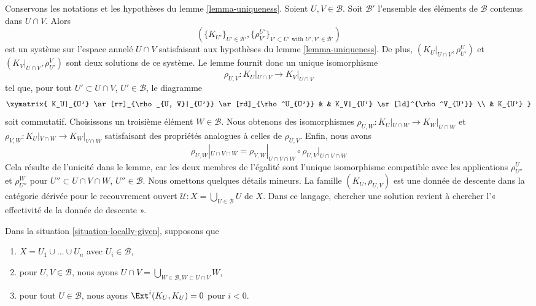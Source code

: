 {\begin{remark}
Conservons les notations et les hypothèses du lemme \ref{lemma-uniqueness}. Soient $U, V \in \mathcal{B}$. Soit $\mathcal{B}'$ l'ensemble des éléments de $\mathcal{B}$ contenus dans $U \cap V$. Alors
$$
(\{K_{U'}\}_{U' \in \mathcal{B}'},
\{\rho_{V'}^{U'}\}_{V' \subset U'\text{ with }U', V' \in \mathcal{B}'})
$$
est un système sur l'espace annelé $U \cap V$
satisfaisant aux hypothèses du lemme \ref{lemma-uniqueness}. De plus, $(K_U|_{U \cap V}, \rho^U_{U'})$ et
$(K_V|_{U \cap V}, \rho^V_{U'})$ sont deux solutions de ce système. Le lemme fournit donc un unique isomorphisme
$$
\rho_{U, V} : K_U|_{U \cap V} \longrightarrow K_V|_{U \cap V}
$$
tel que, pour tout $U' \subset U \cap V$, $U' \in \mathcal{B}$, le diagramme
$$
\xymatrix{
K_U|_{U'} \ar[rr]_{\rho_{U, V}|_{U'}} \ar[rd]_{\rho^U_{U'}} & &
K_V|_{U'} \ar[ld]^{\rho^V_{U'}} \\
& K_{U'}
}
$$
soit commutatif. Choisissons un troisième élément $W \in \mathcal{B}$. Nous obtenons des isomorphismes
$\rho_{U, W} : K_U|_{U \cap W} \to K_W|_{U \cap W}$ et
$\rho_{V, W} : K_U|_{V \cap W} \to K_W|_{V \cap W}$ satisfaisant des propriétés analogues à celles de $\rho_{U, V}$. Enfin, nous avons
$$
\rho_{U, W}|_{U \cap V \cap W} =
\rho_{V, W}|_{U \cap V \cap W} \circ \rho_{U, V}|_{U \cap V \cap W}
$$
Cela résulte de l'unicité dans le lemme, car les deux membres de l'égalité sont l'unique isomorphisme compatible avec les applications $\rho^U_{U''}$ et $\rho^W_{U''}$
pour $U'' \subset U \cap V \cap W$, $U'' \in \mathcal{B}$. Nous omettons quelques détails mineurs. La famille $(K_U, \rho_{U, V})$ est une donnée de descente dans la catégorie dérivée pour le recouvrement ouvert
$\mathcal{U} : X = \bigcup_{U \in \mathcal{B}} U$ de $X$. Dans ce langage, chercher une solution revient à chercher l'« effectivité de la donnée de descente ».

\end{remark}

\begin{lemma}

\label{lemma-solution-in-finite-case}

Dans la situation \ref{situation-locally-given}, supposons que

\begin{enumerate}

\item  $X = U_1 \cup \ldots \cup U_n$ avec $U_i \in \mathcal{B}$,
\item pour $U, V \in \mathcal{B}$, nous ayons
$U \cap V = \bigcup_{W \in \mathcal{B}, W \subset U \cap V} W$,
\item pour tout $U \in \mathcal{B}$, nous ayons $\Ext^i(K_U, K_U) = 0$
pour $i < 0$.


\end{enumerate}
\end{lemma}}
